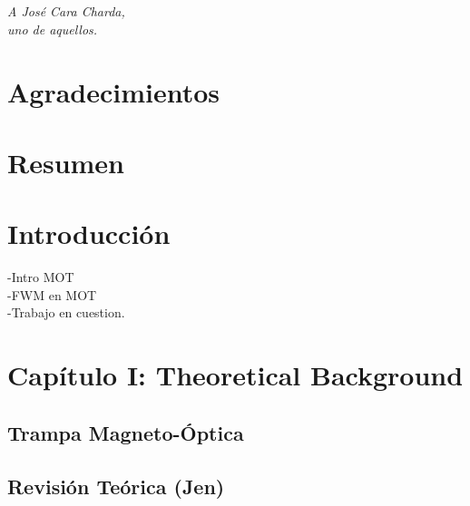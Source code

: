 \documentclass[12pt,twoside]{article}
\begin{document}
\section*{}

\vspace{2cm}
\normalsize

\begin{flushright}
\textit{A José Cara Charda,}\\
\textit{uno de aquellos.}
\end{flushright}

\clearpage

\section*{Agradecimientos}

\clearpage

\section*{Resumen}



\clearpage


\tableofcontents
\clearpage





\section{Introducción}\label{introduccion}

-Intro MOT \\
-FWM en MOT\\
-Trabajo en cuestion.\\


\section{Capítulo I: Theoretical Background}\label{problema}


\subsection{Trampa Magneto-Óptica}\label{MOT}

\subsection{Revisión Teórica (Jen)}\label{JENteorev}
\end{document}
